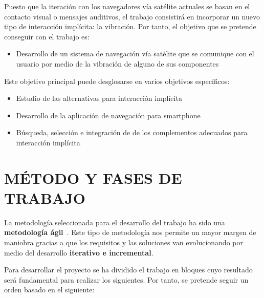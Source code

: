 \documentclass{pre-tfg}
\begin{document}
Puesto que la iteración con los navegadores vía satélite actuales se basan en el contacto
visual o mensajes auditivos, el trabajo consistirá en incorporar un nuevo tipo de
interacción implícita: la vibración. Por tanto, el objetivo que se pretende conseguir con
el trabajo es:

\begin{itemize}
\item Desarrollo de un sistema de navegación vía satélite que se
  comunique con el usuario por medio de la vibración de alguno de sus componentes
\end{itemize}

Este objetivo principal puede desglosarse en varios objetivos específicos:

\begin{itemize}
\item Estudio de las alternativas para interacción implícita
\item Desarrollo de la aplicación de navegación para smartphone
\item Búsqueda, selección e integración de de los complementos adecuados para
  interacción implícita
\end{itemize}

\section{MÉTODO Y FASES DE TRABAJO}

La metodología seleccionada para el desarrollo del trabajo ha sido una \textbf{metodología
  ágil}~\cite{Poole09}. Este tipo de metodología nos permite un mayor margen de maniobra
gracias a que los requisitos y las soluciones van evolucionando por medio del desarrollo
\textbf{iterativo e incremental}.

Para desarrollar el proyecto se ha dividido el trabajo en bloques cuyo resultado será
fundamental para realizar los siguientes. Por tanto, se pretende seguir un orden basado en
el siguiente:
\end{document}
